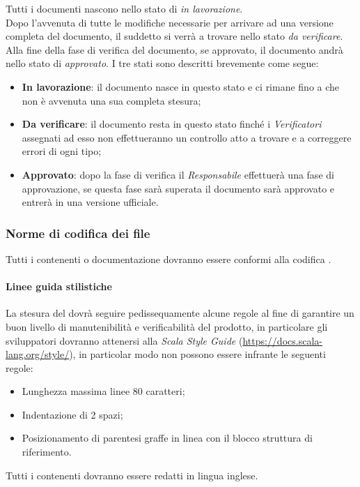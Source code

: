 \documentclass{scalatekids-article}
\begin{document}
Tutti i documenti nascono nello stato di \textit{in lavorazione}.\\
Dopo l'avvenuta di tutte le modifiche necessarie per arrivare ad una versione completa del documento, il suddetto si verrà a trovare nello stato \textit{da verificare}.\\
Alla fine della fase di verifica del documento, se approvato, il documento andrà nello stato di \textit{approvato}.
I tre stati sono descritti brevemente come segue:
\begin{itemize}
\item \textbf{In lavorazione}: il documento nasce in questo stato e ci rimane fino a che non è avvenuta una sua completa stesura;
\item \textbf{Da verificare}: il documento resta in questo stato finché i \textit{Verificatori} assegnati ad esso non effettueranno un controllo atto a trovare e a correggere errori di ogni tipo;
\item \textbf{Approvato}: dopo la fase di verifica il \textit{Responsabile} effettuerà una fase di approvazione, se questa fase sarà superata il documento sarà approvato e entrerà in una versione ufficiale.
\end{itemize}

\subsubsection{Norme di codifica dei file}

Tutti i  contenenti  o documentazione dovranno essere conformi alla
codifica .

\paragraph{Linee guida stilistiche}

La stesura del  dovrà seguire pedissequamente alcune regole al fine di
garantire un buon livello di manutenibilità e verificabilità del prodotto, in
particolare gli sviluppatori dovranno attenersi alla \textit{Scala Style Guide}
(\url{https://docs.scala-lang.org/style/}), in particolar modo non possono
essere infrante le seguenti regole:
\begin{itemize}
\item Lunghezza massima linee 80 caratteri;
\item Indentazione di 2 spazi;
\item Posizionamento di parentesi graffe in linea con il blocco struttura di
  riferimento.
\end{itemize}
Tutti i  contenenti  dovranno essere redatti in lingua inglese.
\end{document}

